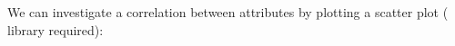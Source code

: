 \begin{center}
\end{center}

We can investigate a correlation  between attributes by plotting a scatter
plot ( library required):

